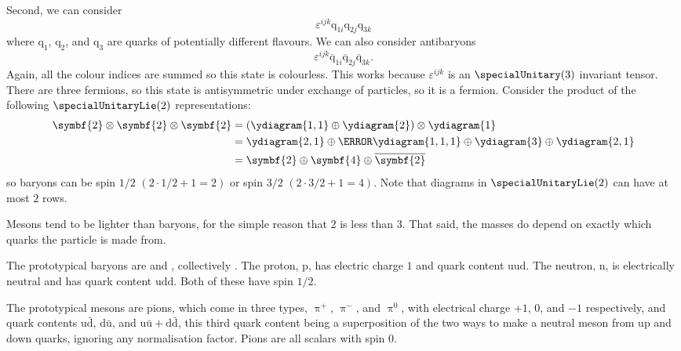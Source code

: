 \documentclass[fleqn]{NotesClass}
\newcommand{\Pparticle}[1]{\mathrm{#1}}
\newcommand{\Pu}{\ensuremath{\Pparticle{u}}}
\newcommand{\Pd}{\ensuremath{\Pparticle{d}}}
\newcommand{\Pq}{\ensuremath{\Pparticle{q}}}
\newcommand{\Ppip}{\ensuremath{\uppi^{+}}}
\newcommand{\Ppim}{\ensuremath{\uppi^{-}}}
\newcommand{\Ppizero}{\ensuremath{\uppi^{0}}}
\newcommand{\Pp}{\ensuremath{\Pparticle{p}}}
\newcommand{\Pn}{\ensuremath{\Pparticle{n}}}
\newcommand{\APantiparticle}[1]{\bar{#1}}
\newcommand{\APu}{\ensuremath{\APantiparticle{\Pparticle{u}}}}
\newcommand{\APd}{\ensuremath{\APantiparticle{\Pparticle{d}}}}
\newcommand{\diracadjoint}[1]{\overbar{#1}}
\newcommand{\rep}[1]{\symbf{#1}}
\begin{document}
    Second, we can consider 
    \begin{equation}
        \varepsilon^{ijk}\Pq_{1i}\Pq_{2j}\Pq_{3k}
    \end{equation}
    where \(\Pq_1\), \(\Pq_2\), and \(\Pq_3\) are quarks of potentially different flavours.
    We can also consider antibaryons
    \begin{equation}
        \varepsilon^{ijk}\diracadjoint{\Pq}_{1i}\diracadjoint{\Pq}_{2j}\diracadjoint{\Pq}_{3k}.
    \end{equation}
    Again, all the colour indices are summed so this state is colourless.
    This works because \(\varepsilon^{ijk}\) is an \(\specialUnitary(3)\) invariant tensor.
    There are three fermions, so this state is antisymmetric under exchange of particles, so it is a fermion.
    Consider the product of the following \(\specialUnitaryLie(2)\) representations:
    \begin{align}
        \rep{2} \otimes \rep{2} \otimes \rep{2} &= \left( \ydiagram{1,1} \oplus \ydiagram{2} \right) \otimes \ydiagram{1}\\
        &= \ydiagram{2,1} \oplus \cancel{\ydiagram{1,1,1}} \oplus \ydiagram{3} \oplus \ydiagram{2,1}\\
        &= \rep{2} \oplus \rep{4} \oplus \overline{\rep{2}}
    \end{align}
    so baryons can be spin \(1/2\) \((2 \cdot 1/2 + 1 = 2)\) or spin \(3/2\) \((2 \cdot 3/2 + 1 = 4)\).
    Note that diagrams in \(\specialUnitaryLie(2)\) can have at most \(2\) rows.
    
    Mesons tend to be lighter than baryons, for the simple reason that \(2\) is less than \(3\).
    That said, the masses do depend on exactly which quarks the particle is made from.
    
    The prototypical baryons are  and , collectively .
    The proton, \(\Pp\), has electric charge \(1\) and quark content \(\Pu\Pu\Pd\).
    The neutron, \(\Pn\), is electrically neutral and has quark content \(\Pu\Pd\Pd\).
    Both of these have spin \(1/2\).
    
    The prototypical mesons are pions, which come in three types, \(\Ppip\), \(\Ppim\), and \(\Ppizero\), with electrical charge \(+1\), \(0\), and \(-1\) respectively, and quark contents \(\Pu\APd\), \(\Pd\APu\), and \(\Pu\APu + \Pd\APd\), this third quark content being a superposition of the two ways to make a neutral meson from up and down quarks, ignoring any normalisation factor.
    Pions are all scalars with spin 0.
    
\end{document}
